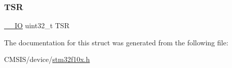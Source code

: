 \subsubsection{\texorpdfstring{TSR}{TSR}}
{\footnotesize\ttfamily \mbox{\hyperlink{core__sc300_8h_aec43007d9998a0a0e01faede4133d6be}{\+\_\+\+\_\+\+IO}} uint32\+\_\+t T\+SR}



The documentation for this struct was generated from the following file\+:\begin{DoxyCompactItemize}
\item 
C\+M\+S\+I\+S/device/\mbox{\hyperlink{stm32f10x_8h}{stm32f10x.\+h}}\end{DoxyCompactItemize}
